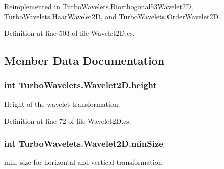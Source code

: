 \-Reimplemented in \hyperlink{class_turbo_wavelets_1_1_biorthogonal53_wavelet2_d_acec9bb2730e6dee78c8f6d5c8d79a523}{\-Turbo\-Wavelets.\-Biorthogonal53\-Wavelet2\-D}, \hyperlink{class_turbo_wavelets_1_1_haar_wavelet2_d_a55f6abb99bf5d87017e715b63f64cc15}{\-Turbo\-Wavelets.\-Haar\-Wavelet2\-D}, and \hyperlink{class_turbo_wavelets_1_1_order_wavelet2_d_af45baa14b0d867362b989db7d41f14dc}{\-Turbo\-Wavelets.\-Order\-Wavelet2\-D}.



\-Definition at line 503 of file \-Wavelet2\-D.\-cs.



\subsection{\-Member \-Data \-Documentation}
\hypertarget{class_turbo_wavelets_1_1_wavelet2_d_afb2aa87b89b82f329357cbdc0cde18a8}{
\subsubsection[{height}]{\setlength{\rightskip}{0pt plus 5cm}int {\bf \-Turbo\-Wavelets.\-Wavelet2\-D.\-height}}}\label{class_turbo_wavelets_1_1_wavelet2_d_afb2aa87b89b82f329357cbdc0cde18a8}


\-Height of the wavelet transformation. 



\-Definition at line 72 of file \-Wavelet2\-D.\-cs.

\hypertarget{class_turbo_wavelets_1_1_wavelet2_d_af5148ef1a46dd5694ccea13aa8f1b9e2}{
\subsubsection[{min\-Size}]{\setlength{\rightskip}{0pt plus 5cm}int {\bf \-Turbo\-Wavelets.\-Wavelet2\-D.\-min\-Size}}}\label{class_turbo_wavelets_1_1_wavelet2_d_af5148ef1a46dd5694ccea13aa8f1b9e2}


min. size for horizontal and vertical transformation 



